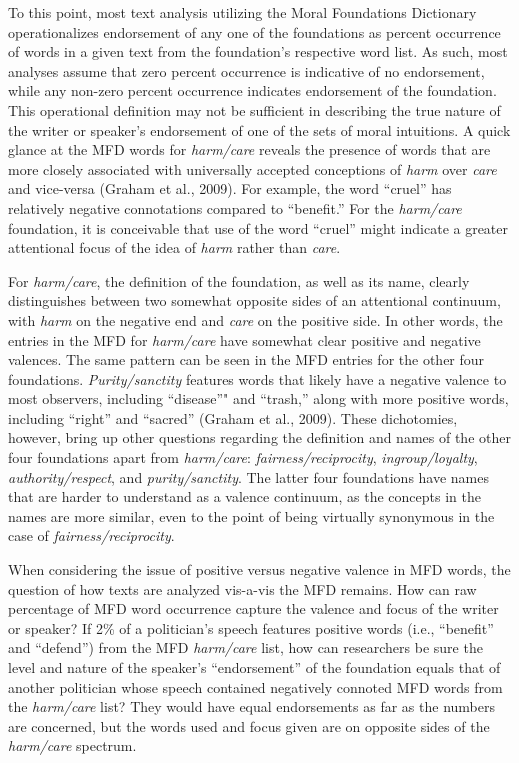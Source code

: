 \documentclass[,man]{apa6}
\begin{document}
To this point, most text analysis utilizing the Moral Foundations
Dictionary operationalizes endorsement of any one of the foundations as
percent occurrence of words in a given text from the foundation's
respective word list. As such, most analyses assume that zero percent
occurrence is indicative of no endorsement, while any non-zero percent
occurrence indicates endorsement of the foundation. This operational
definition may not be sufficient in describing the true nature of the
writer or speaker's endorsement of one of the sets of moral intuitions.
A quick glance at the MFD words for \emph{harm/care} reveals the
presence of words that are more closely associated with universally
accepted conceptions of \emph{harm} over \emph{care} and vice-versa
(Graham et al., 2009). For example, the word \enquote{cruel} has
relatively negative connotations compared to \enquote{benefit.} For the
\emph{harm/care} foundation, it is conceivable that use of the word
\enquote{cruel} might indicate a greater attentional focus of the idea
of \emph{harm} rather than \emph{care}.

For \emph{harm/care}, the definition of the foundation, as well as its
name, clearly distinguishes between two somewhat opposite sides of an
attentional continuum, with \emph{harm} on the negative end and
\emph{care} on the positive side. In other words, the entries in the MFD
for \emph{harm/care} have somewhat clear positive and negative valences.
The same pattern can be seen in the MFD entries for the other four
foundations. \emph{Purity/sanctity} features words that likely have a
negative valence to most observers, including \enquote{disease}" and
\enquote{trash,} along with more positive words, including
\enquote{right} and \enquote{sacred} (Graham et al., 2009). These
dichotomies, however, bring up other questions regarding the definition
and names of the other four foundations apart from \emph{harm/care}:
\emph{fairness/reciprocity}, \emph{ingroup/loyalty},
\emph{authority/respect}, and \emph{purity/sanctity}. The latter four
foundations have names that are harder to understand as a valence
continuum, as the concepts in the names are more similar, even to the
point of being virtually synonymous in the case of
\emph{fairness/reciprocity}.

When considering the issue of positive versus negative valence in MFD
words, the question of how texts are analyzed vis-a-vis the MFD remains.
How can raw percentage of MFD word occurrence capture the valence and
focus of the writer or speaker? If 2\% of a politician's speech features
positive words (i.e., \enquote{benefit} and \enquote{defend}) from the
MFD \emph{harm/care} list, how can researchers be sure the level and
nature of the speaker's \enquote{endorsement} of the foundation equals
that of another politician whose speech contained negatively connoted
MFD words from the \emph{harm/care} list? They would have equal
endorsements as far as the numbers are concerned, but the words used and
focus given are on opposite sides of the \emph{harm/care} spectrum.
\end{document}
